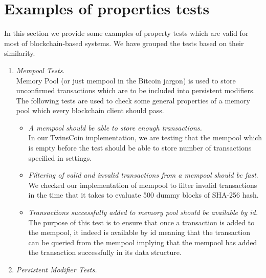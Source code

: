 
\section{Examples of properties tests}
In this section we provide some examples of property tests which are valid for most of blockchain-based systems. We have grouped the tests based on their similarity.

\begin{enumerate}[\IEEEsetlabelwidth{Z}]
\item \textit{Mempool Tests}.\\
Memory Pool (or just mempool in the Bitcoin jargon) is used to store unconfirmed transactions which are to be included into persistent modifiers. The following tests are used to check some general properties of a memory pool which every blockchain client should pass.

\begin{itemize}[]

\item \textit{A mempool should be able to store enough transactions.}\\
In our TwinsCoin implementation, we are testing that the mempool which is empty before the test should be able to store number of transactions specified in settings.

\item \textit{Filtering of valid and invalid transactions from a mempool should be fast}.\\
We checked our implementation of mempool to filter invalid transactions in the time that it takes to evaluate 500 dummy blocks of SHA-256 hash.

\item \textit{Transactions successfully added to memory pool should be available by id.}\\
The purpose of this test is to ensure that once a transaction is added to the mempool, it indeed is available by id meaning that the transaction can be queried from the mempool implying that the mempool has added the transaction successfully in its data structure.
\end{itemize}

\item \textit{Persistent Modifier Tests.}\\


\end{enumerate}

